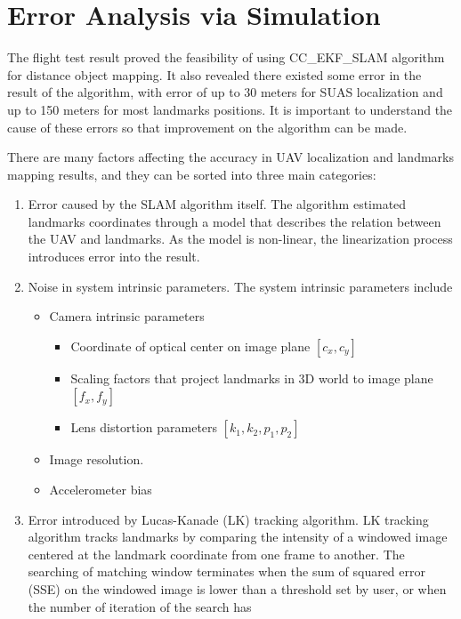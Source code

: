 \chapter{Error Analysis via Simulation}\label{ch:simulation}
The flight test result proved the feasibility of using CC\_EKF\_SLAM
algorithm for distance object mapping. It also revealed there existed
some error in the result of the algorithm, with error of up to 30
meters for SUAS localization and up to 150 meters for most landmarks
positions. It is important to understand the cause of these errors so
that improvement on the algorithm can be made.

There are many factors affecting the accuracy in UAV localization and
landmarks mapping results, and they can be sorted into three main
categories:

\begin{enumerate}
  \item Error caused by the SLAM algorithm itself. The algorithm
  estimated landmarks coordinates through a model that describes the
  relation between the UAV and landmarks. As the model is non-linear,
  the linearization process introduces error into the result.
  \item Noise in system intrinsic parameters. The system intrinsic
  parameters include
  \begin{itemize}
    \item Camera intrinsic parameters
    \begin{itemize}
      \item Coordinate of optical center on image plane $[c_{x}, c_{y}]$
      \item Scaling factors that project landmarks in 3D world to image plane $ [f_{x}, f_{y}]$
      \item Lens distortion parameters $[k_{1}, k_{2}, p_{1}, p_{2}]$
    \end{itemize}
    \item Image resolution.
    \item Accelerometer bias %
  \end{itemize}
  \item Error introduced by Lucas-Kanade (LK) tracking algorithm. LK
  tracking algorithm tracks landmarks by comparing the intensity of a
  windowed image centered at the landmark coordinate from one frame to
  another. The searching of matching window terminates when the sum of
  squared error (SSE) on the windowed image is lower than a threshold
  set by user, or when the number of iteration of the search has

\end{enumerate}
